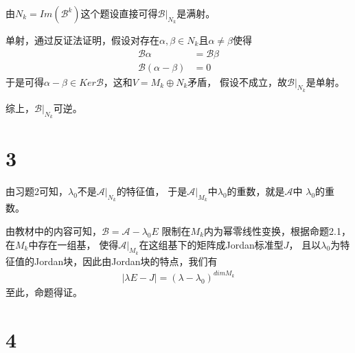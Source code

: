 \documentclass{article}
\begin{document}
由$N_k = Im(\mathscr{B}^k)$这个题设直接可得$\mathscr{B}\big|_{N_k}$是满射。

单射，通过反证法证明，假设对存在$\alpha, \beta \in N_k$且$\alpha \neq \beta$使得
\begin{align*}
  \mathscr{B} \alpha           & = \mathscr{B} \beta \\
  \mathscr{B} (\alpha - \beta) & = 0
\end{align*}
于是可得$\alpha - \beta \in Ker \mathscr{B}$，这和$V = M_k \oplus N_k$矛盾，
假设不成立，故$\mathscr{B}\big|_{N_k}$是单射。

综上，$\mathscr{B}\big|_{N_k}$可逆。

\section*{3}

由习题2可知，$\lambda_0$不是$\mathscr{A} \big|_{N_k}$的特征值，
于是$\mathscr{A}\big|_{M_k}$中$\lambda_0$的重数，就是$\mathscr{A}$中
$\lambda_0$的重数。

由教材中的内容可知，$\mathscr{B} = \mathscr{A} - \lambda_0 E$
限制在$M_k$内为幂零线性变换，根据命题2.1，在$M_k$中存在一组基，
使得$\mathscr{A}\big|_{M_k}$在这组基下的矩阵成Jordan标准型$J$，
且以$\lambda_0$为特征值的Jordan块，因此由Jordan块的特点，我们有
\begin{align*}
  |\lambda E - J| = (\lambda - \lambda_0)^{dim M_k}
\end{align*}
至此，命题得证。

\section*{4}
\end{document}
